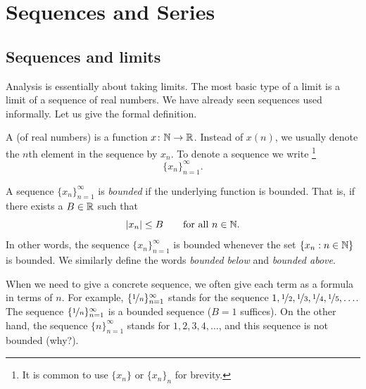 \chapter{Sequences and Series} \label{seq:chapter}


\section{Sequences and limits}
\label{sec:seqsandlims}



Analysis is essentially about taking limits.  The most basic type of a limit
is a limit of a sequence of real numbers.
We have already seen sequences used informally.  Let us give the formal
definition.

\begin{defn}
A \emph{} (of real numbers) is a function $x \colon {\mathbb{N}} \to
{\mathbb{R}}$.  Instead of $x(n)$, we 
usually denote the $n$th element in the sequence by $x_n$.
To denote a sequence we write%
\footnote{It is common to use $\{ x_n \}$ or $\{ x_n \}_n$ for brevity.}%
%
\begin{equation*}
\{ x_n \}_{n=1}^\infty.
\end{equation*}

A sequence $\{ x_n \}_{n=1}^\infty$ is \emph{bounded} if
the underlying function is bounded.  That is, if
there exists a $B \in {\mathbb{R}}$ such that
\begin{equation*}
\lvert {x_n} \rvert \leq B \qquad \text{for all } n \in {\mathbb{N}}.
\end{equation*}
In other words, the sequence $\{x_n\}_{n=1}^\infty$ is bounded whenever
the set $\{ x_n : n \in {\mathbb{N}} \}$
is bounded.
We similarly define the words
\emph{bounded below} and
\emph{bounded above}.
\end{defn}

When we need
to give a concrete sequence, we often give each term as a formula in
terms of $n$.
For example, $\{ \nicefrac{1}{n} \}_{n=1}^\infty$ stands for
the sequence $1, \nicefrac{1}{2}, \nicefrac{1}{3}, \nicefrac{1}{4},
\nicefrac{1}{5}, \ldots$.
The sequence $\{ \nicefrac{1}{n} \}_{n=1}^\infty$
is a bounded sequence ($B=1$ suffices).  On the other hand, the sequence
$\{ n \}_{n=1}^\infty$ stands for
$1,2,3,4,\ldots$, and this sequence is not bounded (why?).

